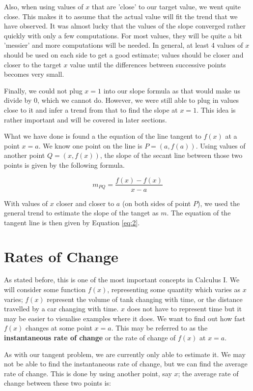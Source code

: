 \documentclass[12pt]{article}
\theoremstyle{definition}
\begin{document}
Also, when using values of $x$ that are 'close' to our target value, we went quite close.
This makes it to assume that the actual value will fit the trend that we have observed.
It was almost lucky that the values of the slope converged rather quickly with only a few computations.
For most values, they will be quite a bit 'messier' and more computations will be needed.
In general, at least 4 values of $x$ should be used on each side to get a good estimate; values should be closer and closer to the target $x$ value until the differences between successive points becomes very small.

Finally, we could not plug $x=1$ into our slope formula as that would make us divide by 0, which we cannot do.
However, we were still able to plug in values close to it and infer a trend from that to find the slope at $x=1$.
This idea is rather important and will be covered in later sections.

What we have done is found a the equation of the line tangent to $f(x)$ at a point $x=a$.
We know one point on the line is $P=(a, f(a))$.
Using values of another point $Q=(x,f(x))$, the slope of the secant line between those two points is given by the following formula.

\begin{equation}
    m_{PQ} = \frac{f(x)-f(x)}{x-a}
\end{equation}

With values of $x$ closer and closer to $a$ (on both sides of point $P$), we used the general trend to estimate the slope of the tanget as $m$.
The equation of the tangent line is then given by Equation \eqref{eq:2}.

\section{Rates of Change}
As stated before, this is one of the most important concepts in Calculus I.
We will consider some function $f(x)$, representing some quantity which varies as $x$ varies; $f(x)$ represent the volume of tank changing with time, or the distance travelled by a car changing with time.
$x$ does not have to represent time but it may be easier to visualise examples where it does.
We want to find out how fast $f(x)$ changes at some point $x=a$.
This may be referred to as the \textbf{instantaneous rate of change} or the rate of change of $f(x)$ at $x=a$.

As with our tangent problem, we are currently only able to estimate it.
We may not be able to find the instantaneous rate of change, but we can find the average rate of change.
This is done by using another point, say $x$; the average rate of change between these two points is:
\end{document}
